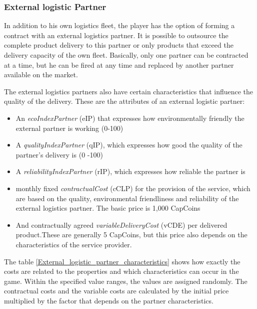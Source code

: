 \subsubsection{External logistic Partner}
In addition to his own logistics fleet, the player has the option of forming a contract with an external logistics partner. It is possible to outsource the complete product delivery to this partner or only products that exceed the delivery capacity of the own fleet. Basically, only one partner can be contracted at a time, but he can be fired at any time and replaced by another partner available on the market. 

The external logistics partners also have certain characteristics that influence the quality of the delivery. These are the attributes of an external logistic partner:  

\begin{itemize}
    \item An \textit{ecoIndexPartner} (\gls{eIP}) that expresses how environmentally friendly the external partner is working (0-100)
    \item A \textit{qualityIndexPartner} (\gls{qIP}), which expresses how good the quality of the partner's delivery is (0 -100)
    \item A \textit{reliabilityIndexPartner} (\gls{rIP}), which expresses how reliable the partner is
    \item monthly fixed \textit{contractualCost} (\gls{cCLP}) for the provision of the service, which are based on the quality, environmental friendliness and reliability of the external logistics partner. The basic price is 1,000 CapCoins 
    \item And contractually agreed \textit{variableDeliveryCost} (\gls{vCDE}) per delivered product.These are generally 5 CapCoins, but this price also depends on the characteristics of the service provider.
\end{itemize}

The table \ref{External_logistic_partner_characteristics} shows how exactly the costs are related to the properties and which characteristics can occur in the game. Within the specified value ranges, the values are assigned randomly. The contractual costs and the variable costs are calculated by the initial price multiplied by the factor that depends on the partner characteristics.


